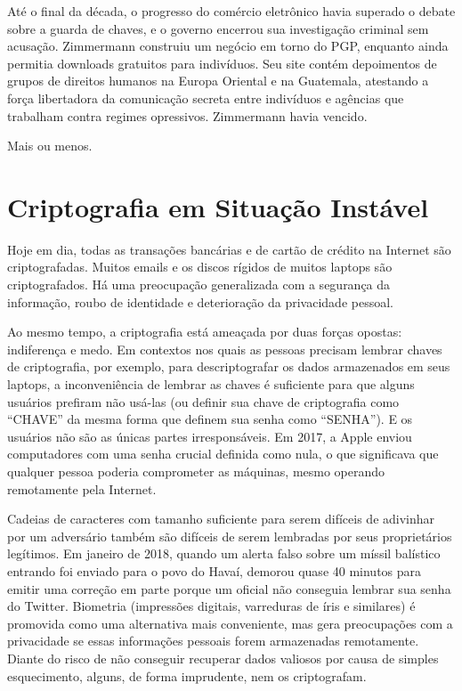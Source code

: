 \documentclass{book}
\begin{document}
Até o final da década, o progresso do comércio eletrônico havia superado o debate sobre a guarda de chaves, e o governo encerrou sua investigação criminal sem acusação. Zimmermann construiu um negócio em torno do PGP, enquanto ainda permitia downloads gratuitos para indivíduos. Seu site contém depoimentos de grupos de direitos humanos na Europa Oriental e na Guatemala, atestando a força libertadora da comunicação secreta entre indivíduos e agências que trabalham contra regimes opressivos. Zimmermann havia vencido.

Mais ou menos.

\section{Criptografia em Situação Instável}
\label{segredos:crip-sit-instavel}

Hoje em dia, todas as transações bancárias e de cartão de crédito na Internet são criptografadas. Muitos emails e os discos rígidos de muitos laptops são criptografados. Há uma preocupação generalizada com a segurança da informação, roubo de identidade e deterioração da privacidade pessoal.

Ao mesmo tempo, a criptografia está ameaçada por duas forças opostas: indiferença e medo. Em contextos nos quais as pessoas precisam lembrar chaves de criptografia, por exemplo, para descriptografar os dados armazenados em seus laptops, a inconveniência de lembrar as chaves é suficiente para que alguns usuários prefiram não usá-las (ou definir sua chave de criptografia como ``CHAVE'' da mesma forma que definem sua senha como ``SENHA''). E os usuários não são as únicas partes irresponsáveis. Em 2017, a Apple enviou computadores com uma senha crucial definida como nula, o que significava que qualquer pessoa poderia comprometer as máquinas, mesmo operando remotamente pela Internet.

Cadeias de caracteres com tamanho suficiente para serem difíceis de adivinhar por um adversário também são difíceis de serem lembradas por seus proprietários legítimos. Em janeiro de 2018, quando um alerta falso sobre um míssil balístico entrando foi enviado para o povo do Havaí, demorou quase 40 minutos para emitir uma correção em parte porque um oficial não conseguia lembrar sua senha do Twitter. Biometria (impressões digitais, varreduras de íris e similares) é promovida como uma alternativa mais conveniente, mas gera preocupações com a privacidade se essas informações pessoais forem armazenadas remotamente. Diante do risco de não conseguir recuperar dados valiosos por causa de simples esquecimento, alguns, de forma imprudente, nem os criptografam.
\end{document}
